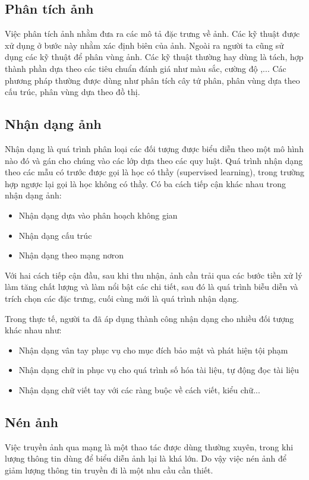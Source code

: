 \documentclass[12pt,oneside,a4]{report}
\begin{document}
\subsection{Phân tích ảnh}
Việc phân tích ảnh nhằm đưa ra các mô tả đặc trưng về ảnh. Các kỹ thuật được xử dụng ở bước này nhằm xác định biên của ảnh. Ngoài ra người ta cũng sử dụng các kỹ thuật để phân vùng ảnh. Các kỹ thuật thường hay dùng là tách, hợp thành phần dựa theo các tiêu chuẩn đánh giá như màu sắc, cường độ ,... Các phương pháp thường được dùng như phân tích cây tứ phân, phân vùng dựa theo cấu trúc, phân vùng dựa theo đồ thị.
\subsection{Nhận dạng ảnh}
Nhận dạng là quá trình phân loại các đối tượng được biểu diễn theo một mô hình nào đó và gán cho chúng vào các lớp dựa theo các quy luật. Quá trình nhận dạng theo các mẫu có trước được gọi là học có thầy (supervised learning), trong trường hợp ngược lại gọi là học không có thầy. Có ba cách tiếp cận khác nhau trong nhận dạng ảnh: 
\begin{itemize}
\item Nhận dạng dựa vào phân hoạch không gian
\item Nhận dạng  cấu trúc
\item Nhận dạng theo mạng nơron
\end{itemize}
Với hai cách tiếp cận đầu, sau khi thu nhận, ảnh cần trải qua các bước tiền xử lý làm tăng chất lượng và làm nổi bật các chi tiết, sau đó là quá trình biễu diễn và trích chọn các đặc trưng, cuối cùng mới là quá trình nhận dạng.

Trong thực tế, người ta đã áp dụng thành công nhận dạng cho nhiều đối tượng khác nhau như: 

\begin{itemize}
\item Nhận dạng vân tay phục vụ cho mục đích bảo mật và phát hiện tội phạm
\item Nhận dạng chữ in phục vụ  cho quá trình số hóa tài liệu, tự động đọc tài liệu
\item Nhận dạng chữ viết tay với các ràng buộc về cách viết, kiểu chữ... 
\end{itemize}
\subsection{Nén ảnh}
Việc truyền ảnh qua mạng là một thao tác được dùng thường xuyên, trong khi lượng thông tin dùng để biểu diễn ảnh lại là khá lớn. Do vậy việc nén ảnh để giảm lượng thông tin truyền đi là một nhu cầu cần thiết.
\end{document}
